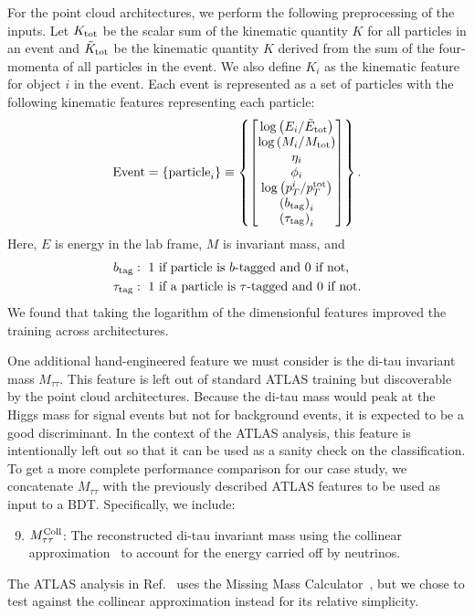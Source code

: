\documentclass[aps,prd,twocolumn,superscriptaddress,floatfix,longbibliography,preprintnumbers,nofootinbib]{revtex4-1} %
\DeclareRobustCommand{\RRef}[1]{Ref.~\cite{#1}}
\begin{document}
For the point cloud architectures, we perform the following preprocessing of the inputs.
%
Let $K_{\rm tot}$ be the scalar sum of the kinematic quantity $K$ for all particles in an event and $\tilde K_{\rm tot}$ be the kinematic quantity $K$ derived from the sum of the four-momenta of all particles in the event.
%
We also define $K_i$ as the kinematic feature for object $i$ in the event.
%
Each event is represented as a set of particles with the following kinematic features representing each particle:  
%
\begin{equation}
    {\rm Event}=\left\{ {\rm particle}_i \right\} \equiv \left\{   \left[\begin{matrix}  \log\big( {E_{i}} / {\tilde E_{\rm tot} } \big) \\  \log\left( {M_{i}}/{M_{\rm tot} } \right)\\ \eta_{i} \\  \phi_{i}\\  \log\left( {p^{i}_T}/{p^{\rm tot}_T} \right) \\  \left( b_{\rm tag} \right) _i\\  \left( \tau_{\rm tag} \right)_i   
  \end{matrix}   \right]\right\}.
  \label{eq:rep}
\end{equation}
%
Here, $E$ is energy in the lab frame, $M$ is invariant mass, and
%
\begin{align*}
    b_{\rm tag}&: \textrm{ \(1\) if particle is \(b\)-tagged and \(0\) if not},\\
    \tau_{\rm tag}&: \textrm{ \(1\) if a particle is \(\tau\)-tagged and \(0\) if not}.
\end{align*}
%
We found that taking the logarithm of the dimensionful features improved the training across architectures.


One additional hand-engineered feature we must consider is the  di-tau invariant mass $M_{\tau\tau}$.
%
This feature is left out of standard ATLAS training but discoverable by the point cloud architectures. 
%
Because the di-tau mass would peak at the Higgs mass for signal events but not for background events, it is expected to be a good discriminant.  
%
In the context of the ATLAS analysis, this feature is intentionally left out so that it can be used as a sanity check on the classification.
%
To get a more complete performance comparison for our case study, we concatenate $M_{\tau\tau}$ with the previously described ATLAS features to be used as input to a BDT.
%
Specifically, we include:
% 
\begin{enumerate}
\setcounter{enumi}{8}
\item $M_{\tau\tau}^{\rm Coll}$:  The reconstructed di-tau invariant mass using the collinear approximation~\cite{Ellis:1987xu, Elagin:2010aw, Konar:2016wbh} to account for the energy carried off by neutrinos.
\end{enumerate}
%
The ATLAS analysis in \RRef{ATLAS:2022yrq} uses the Missing Mass Calculator~\cite{Elagin:2010aw}, but we chose to test against the collinear approximation instead for its relative simplicity.
\end{document}
